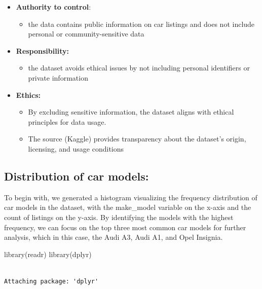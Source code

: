 \documentclass[
  letterpaper,
  DIV=11,
  numbers=noendperiod]{scrartcl}
\newenvironment{Shaded}{\begin{snugshade}}{\end{snugshade}}
\newcommand{\FunctionTok}[1]{\textcolor[rgb]{0.28,0.35,0.67}{#1}}
\newcommand{\NormalTok}[1]{\textcolor[rgb]{0.00,0.23,0.31}{#1}}
\providecommand{\tightlist}{%
  \setlength{\itemsep}{0pt}\setlength{\parskip}{0pt}}\usepackage{longtable,booktabs,array}
\begin{document}
\begin{itemize}
\item
  \textbf{Authority to control}:

  \begin{itemize}
  \tightlist
  \item
    the data contains public information on car listings and does not
    include personal or community-sensitive data
  \end{itemize}
\item
  \textbf{Responsibility:}

  \begin{itemize}
  \tightlist
  \item
    the dataset avoids ethical issues by not including personal
    identifiers or private information
  \end{itemize}
\item
  \textbf{Ethics:}

  \begin{itemize}
  \item
    By excluding sensitive information, the dataset aligns with ethical
    principles for data usage.
  \item
    The source (Kaggle) provides transparency about the dataset's
    origin, licensing, and usage conditions
  \end{itemize}
\end{itemize}

\subsection{Distribution of car
models:}\label{distribution-of-car-models}

To begin with, we generated a histogram visualizing the frequency
distribution of car models in the dataset, with the make\_model variable
on the x-axis and the count of listings on the y-axis. By identifying
the models with the highest frequency, we can focus on the top three
most common car models for further analysis, which in this case, the
Audi A3, Audi A1, and Opel Insignia.

\begin{Shaded}
\begin{Highlighting}[]
\FunctionTok{library}\NormalTok{(readr)}
\FunctionTok{library}\NormalTok{(dplyr)}
\end{Highlighting}
\end{Shaded}

\begin{verbatim}

Attaching package: 'dplyr'
\end{verbatim}
\end{document}
